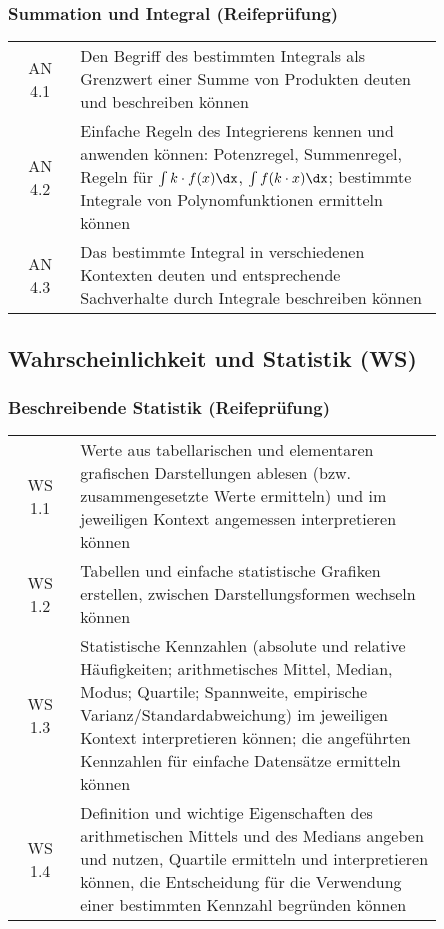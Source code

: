 \documentclass[a4paper,12pt]{article}
\begin{document}
\subsubsection{Summation und Integral (Reifeprüfung)}
\begin{tabular}{cp{0.85\linewidth}}
AN 4.1 & Den Begriff des bestimmten Integrals als Grenzwert einer Summe von Produkten deuten und beschreiben können\\
AN 4.2 & Einfache Regeln des Integrierens kennen und anwenden können: Potenzregel, Summenregel, Regeln für $\int k\cdot f(x)\dx$, $\int f(k\cdot x)\dx$; bestimmte Integrale von Polynomfunktionen ermitteln können \\
AN 4.3 & Das bestimmte Integral in verschiedenen Kontexten deuten und entsprechende Sachverhalte durch Integrale beschreiben können\\
\end{tabular}


\newpage

\subsection{Wahrscheinlichkeit und Statistik (WS)}

\subsubsection{Beschreibende Statistik (Reifeprüfung)}
\begin{tabular}{cp{0.85\linewidth}}
WS 1.1 & Werte aus tabellarischen und elementaren grafischen Darstellungen ablesen (bzw. zusammengesetzte Werte ermitteln) und im jeweiligen Kontext angemessen interpretieren können\\
WS 1.2 & Tabellen und einfache statistische Grafiken erstellen, zwischen Darstellungsformen wechseln können\\
WS 1.3 & Statistische Kennzahlen (absolute und relative Häufigkeiten; arithmetisches Mittel, Median, Modus; Quartile; Spannweite, empirische Varianz/Standardabweichung) im jeweiligen Kontext interpretieren können; die angeführten Kennzahlen für einfache Datensätze ermitteln können\\
WS 1.4 & Definition und wichtige Eigenschaften des arithmetischen Mittels und des Medians angeben und nutzen, Quartile ermitteln und interpretieren können, die Entscheidung für die Verwendung einer bestimmten Kennzahl begründen können\\
\end{tabular}
\end{document}

